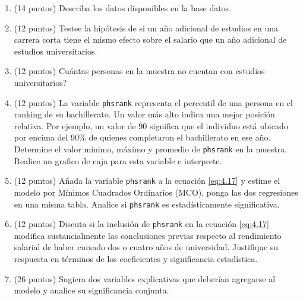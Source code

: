 \documentclass[letterpaper,11pt]{article}
\begin{document}
\begin{enumerate}

\item (14 puntos) Describa los datos disponibles en la base datos.
       \item (12 puntos) Testee la hipótesis de si un año adicional de estudios en una carrera corta tiene el mismo efecto sobre el salario que un año adicional de estudios universitarios.

\item (12 puntos) Cu\'antas personas en la muestra no cuentan con estudios universitarios? 
        
 \item (12 puntos)   La variable \texttt{phsrank} representa el percentil de una persona en el ranking de su bachillerato. Un valor más alto indica una mejor posición relativa. Por ejemplo, un valor de 90 significa que el individuo está ubicado por encima del 90\% de quienes completaron el bachillerato en ese año. Determine el valor mínimo, máximo y promedio de \texttt{phsrank} en la muestra. Realice un grafico de caja para esta variable  e interprete. 

    \item (12 puntos)
    Añada la variable \texttt{phsrank} a la ecuación \eqref{eq:4.17} y estime el modelo por Mínimos Cuadrados Ordinarios (MCO), ponga las dos regresiones en una misma tabla.  Analice si \texttt{phsrank} es estadísticamente significativa. 

    \item (12 puntos)
    Discuta si la inclusión de \texttt{phsrank} en la ecuación \eqref{eq:4.17} modifica sustancialmente las conclusiones previas respecto al rendimiento salarial de haber cursado dos o cuatro años de universidad. Justifique su respuesta en términos de los coeficientes y significancia estadística.

    \item (26 puntos) Sugiera dos variables explicativas que deberían agregarse al modelo y analice su significancia conjunta.
   
\end{enumerate}
\end{document}
